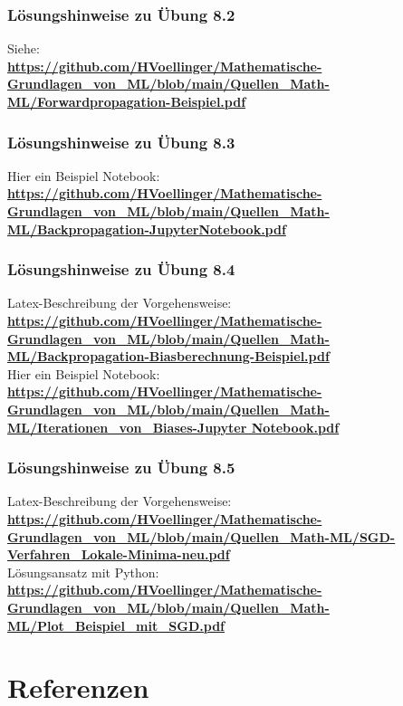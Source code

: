 \documentclass[12pt]{article}
\begin{document}
\subsubsection{Lösungshinweise zu Übung 8.2}
Siehe:\\
\textbf{\url{https://github.com/HVoellinger/Mathematische-Grundlagen_von_ML/blob/main/Quellen_Math-ML/Forwardpropagation-Beispiel.pdf}}

\subsubsection{Lösungshinweise zu Übung 8.3}
Hier ein Beispiel Notebook:\\
\textbf{\url{https://github.com/HVoellinger/Mathematische-Grundlagen_von_ML/blob/main/Quellen_Math-ML/Backpropagation-JupyterNotebook.pdf}}  

\subsubsection{Lösungshinweise zu Übung 8.4}

Latex-Beschreibung der Vorgehensweise: \\
\textbf{\url{https://github.com/HVoellinger/Mathematische-Grundlagen_von_ML/blob/main/Quellen_Math-ML/Backpropagation-Biasberechnung-Beispiel.pdf}} \\[0.4cm]
%
Hier ein Beispiel Notebook:\\
\textbf{\url{https://github.com/HVoellinger/Mathematische-Grundlagen_von_ML/blob/main/Quellen_Math-ML/Iterationen_von_Biases-Jupyter Notebook.pdf}}  

\subsubsection{Lösungshinweise zu Übung 8.5}
Latex-Beschreibung der Vorgehensweise: \\
\textbf{\url{https://github.com/HVoellinger/Mathematische-Grundlagen_von_ML/blob/main/Quellen_Math-ML/SGD-Verfahren_Lokale-Minima-neu.pdf}} \\[0.2cm]
Lösungsansatz mit Python: \\[0.1cm]
\textbf{\url{https://github.com/HVoellinger/Mathematische-Grundlagen_von_ML/blob/main/Quellen_Math-ML/Plot_Beispiel_mit_SGD.pdf}} 

\newpage

 \section{Referenzen}
\end{document}
